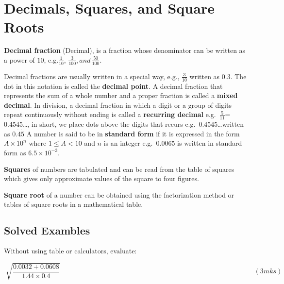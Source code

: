 \documentclass[
  a4paperpaper,
]{scrbook}
\begin{document}

\chapter*{Decimals, Squares, and Square
Roots}\label{decimals-squares-and-square-roots}


\textbf{Decimal fraction} (Decimal), is a fraction whose denominator can
be written as a power of \(10\),
e.g.\(\frac{1}{10},\,\frac{3}{100}, and\,\frac{50}{100}\).

Decimal fractions are usually written in a special way, e.g.,
\(\frac{3}{10}\) written as \(0.3\). The dot in this notation is called
the \textbf{decimal point}. A decimal fraction that represents the sum
of a whole number and a proper fraction is called a \textbf{mixed
decimal}. In division, a decimal fraction in which a digit or a group of
digits repeat continuously without ending is called a \textbf{recurring
decimal} e.g.~\(\frac{5}{11}\)= 0.4545\ldots, in short, we place dots
above the digits that recurs e.g.~0.4545\ldots written as
\(0.\dot{4}\dot{5}\) A number is said to be in \textbf{standard form} if
it is expressed in the form \(A\times 10^n\) where \(1\leq A<10\) and
\(n\) is an integer e.g.~\(0.0065\) is written in standard form as
\(6.5\times 10^{-3}\).

\textbf{Squares} of numbers are tabulated and can be read from the table
of squares which gives only approximate values of the square to four
figures.

\textbf{Square root} of a number can be obtained using the factorization
method or tables of square roots in a mathematical table.

\section{Solved Exambles}\label{solved-exambles}

\begin{tcolorbox}[enhanced jigsaw, left=2mm, colframe=quarto-callout-note-color-frame, toptitle=1mm, opacitybacktitle=0.6, rightrule=.15mm, colbacktitle=quarto-callout-note-color!10!white, colback=white, arc=.35mm, breakable, leftrule=.75mm, bottomtitle=1mm, bottomrule=.15mm, title=\textcolor{quarto-callout-note-color}{\faInfo}\hspace{0.5em}{Example 1}, titlerule=0mm, coltitle=black, toprule=.15mm, opacityback=0]

Without using table or calculators, evaluate:

\[
\sqrt[]{\frac{0.0032+0.0608}{1.44\times 0.4}} \hspace{12cm} (3mks)
\]

\end{tcolorbox}
\end{document}
